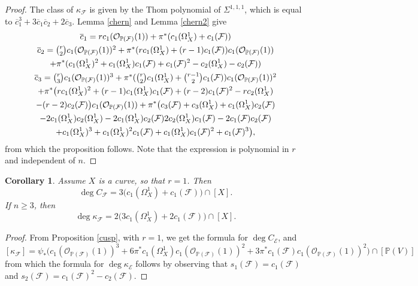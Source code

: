 \documentclass[reqno]{amsart}
\newtheorem{cor}[lemma]{Corollary}
\theoremstyle{definition}
\theoremstyle{remark}
\begin{document}
\begin{proof} The class of $\kappa_\mathcal F$ is given by the Thom polynomial of $\Sigma^{1,1,1}$, which is equal to $\overline c_1^3+3\overline c_1\overline c_2+2\overline c_3$.  Lemma \ref{chern} and Lemma \ref{chern2} give 
\begin{multline*}
\textstyle \overline c_1=rc_1(\mathcal O_{\mathbb P(\mathcal F)}(1))+\pi^*(c_1(\Omega^1_X)+c_1(\mathcal F) )\\
\textstyle \overline c_2=\binom{r}2 c_1(\mathcal O_{\mathbb P(\mathcal F)}(1))^2+\pi^*(rc_1(\Omega^1_X)+(r-1)c_1(\mathcal F))c_1(\mathcal O_{\mathbb P(\mathcal F)}(1))\\
+\pi^*(c_1(\Omega^1_X)^2+c_1(\Omega^1_X)c_1(\mathcal F)+c_1(\mathcal F)^2
-c_2(\Omega^1_X)-c_2(\mathcal F))\\
\textstyle \overline c_3=\binom{r}3c_1(\mathcal O_{\mathbb P(\mathcal F)}(1))^3 +\pi^*(\binom{r}2 c_1(\Omega_X^1)+\binom{r-1}2 c_1(\mathcal F))c_1(\mathcal O_{\mathbb P(\mathcal F)}(1))^2 \\+\pi^*\bigl(rc_1(\Omega_X^1)^2+(r-1)c_1(\Omega_X^1)c_1(\mathcal F)
+(r-2)c_1(\mathcal F)^2-rc_2(\Omega_X^1)\\
-(r-2)c_2(\mathcal F)\bigr)c_1(\mathcal O_{\mathbb P(\mathcal F)}(1))
+\pi^*\bigl(c_3(\mathcal F)+c_3(\Omega_X^1)+c_1(\Omega_X^1)c_2(\mathcal F)\\
-2c_1(\Omega_X^1)c_2(\Omega_X^1)-2c_1(\Omega_X^1)c_2(\mathcal F)\-2c_2(\Omega_X^1)c_1(\mathcal F)
-2c_1(\mathcal F)c_2(\mathcal F)\\
+c_1(\Omega_X^1)^3+c_1(\Omega_X^1)^2c_1(\mathcal F)+c_1(\Omega_X^1)c_1(\mathcal F)^2+c_1(\mathcal F)^3\bigr),
\end{multline*}
from which the proposition follows. Note that the expression is polynomial in $r$ and independent of $n$.
\end{proof}

\begin{cor}\label{degcuspcurve}
Assume $X$ is a curve, so that $r=1$. Then
\[\deg C_\mathcal F=
3\bigl(c_1(\Omega^1_X)+c_1(\mathcal F)\bigr)\cap [X].
\]
If $n\ge 3$, then
\[\deg \kappa_\mathcal F=2\bigl(3c_1(\Omega^1_X)+2c_1(\mathcal F)\bigr)\cap [X] .\]
\end{cor}

\begin{proof}
From Proposition \ref{cusp}, with $r=1$, we get the formula for $\deg C_\mathcal E$, and
\[[\kappa_\mathcal F]= \psi_*\bigl(c_1(\mathcal O_{\mathbb P(\mathcal F)}(1))^3 +6\pi^*c_1(\Omega^1_X)c_1(\mathcal O_{\mathbb P(\mathcal F)}(1))^2
+3\pi^*c_1(\mathcal F) c_1(\mathcal O_{\mathbb P(\mathcal F)}(1))^2\bigr)\cap [\mathbb P(V)]
\]
from which the formula for $\deg \kappa_\mathcal E$ follows by observing that  $s_1(\mathcal F)=c_1(\mathcal F)$ and $s_2(\mathcal F)=c_1(\mathcal F)^2-c_2(\mathcal F)$.
\end{proof}
\end{document}

